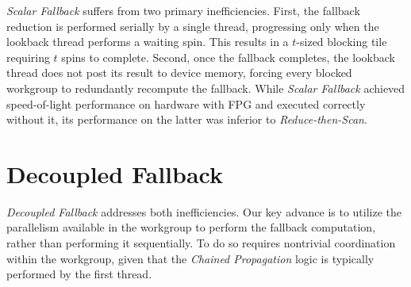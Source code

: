 \documentclass[acmsmall, manuscript, screen, review, anonymous]{acmart}
\begin{document}
\emph{Scalar Fallback} suffers from two primary inefficiencies. First, the fallback reduction is performed serially by a single thread, progressing only when the lookback thread performs a waiting spin. This results in a $t$-sized blocking tile requiring $t$ spins to complete. Second, once the fallback completes, the lookback thread does not post its result to device memory, forcing every blocked workgroup to redundantly recompute the fallback. While \emph{Scalar Fallback} achieved speed-of-light performance on hardware with FPG and executed correctly without it, its performance on the latter was inferior to \emph{Reduce-then-Scan}.

\section{Decoupled Fallback}
\emph{Decoupled Fallback} addresses both inefficiencies. Our key advance is to utilize the parallelism available in the workgroup to perform the fallback computation, rather than performing it sequentially. To do so requires nontrivial coordination within the workgroup, given that the \emph{Chained Propagation} logic is typically performed by the first thread.
\end{document}
